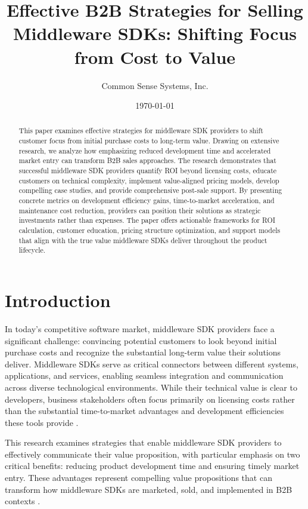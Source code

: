 \documentclass[11pt,a4paper]{article}
\title{\LARGE\textbf{Effective B2B Strategies for Selling Middleware SDKs: Shifting Focus from Cost to Value}}
\author{Common Sense Systems, Inc.}
\date{\today}
\begin{document}
\maketitle
\thispagestyle{fancy}

\begin{abstract}
This paper examines effective strategies for middleware SDK providers to shift customer focus from initial purchase costs to long-term value. Drawing on extensive research, we analyze how emphasizing reduced development time and accelerated market entry can transform B2B sales approaches. The research demonstrates that successful middleware SDK providers quantify ROI beyond licensing costs, educate customers on technical complexity, implement value-aligned pricing models, develop compelling case studies, and provide comprehensive post-sale support. By presenting concrete metrics on development efficiency gains, time-to-market acceleration, and maintenance cost reduction, providers can position their solutions as strategic investments rather than expenses. The paper offers actionable frameworks for ROI calculation, customer education, pricing structure optimization, and support models that align with the true value middleware SDKs deliver throughout the product lifecycle.
\end{abstract}

\tableofcontents
\newpage

\section{Introduction}

In today's competitive software market, middleware SDK providers face a significant challenge: convincing potential customers to look beyond initial purchase costs and recognize the substantial long-term value their solutions deliver. Middleware SDKs serve as critical connectors between different systems, applications, and services, enabling seamless integration and communication across diverse technological environments. While their technical value is clear to developers, business stakeholders often focus primarily on licensing costs rather than the substantial time-to-market advantages and development efficiencies these tools provide \cite{boomi2023}.

This research examines strategies that enable middleware SDK providers to effectively communicate their value proposition, with particular emphasis on two critical benefits: reducing product development time and ensuring timely market entry. These advantages represent compelling value propositions that can transform how middleware SDKs are marketed, sold, and implemented in B2B contexts \cite{tradecentric2023}.
\end{document}

